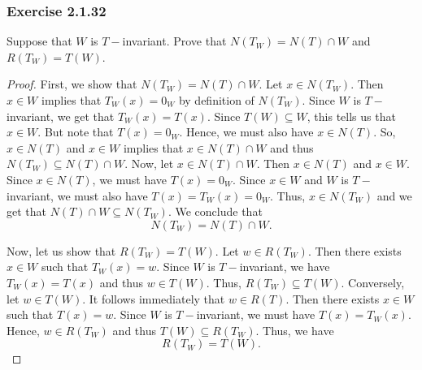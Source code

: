\subsubsection{Exercise 2.1.32} Suppose that \( W  \) is \( T- \)invariant. Prove that \( N(T_{W}) = N(T) \cap W  \) and \( R(T_{W}) = T(W) \).
\begin{proof}
    First, we show that \( N(T_{W}) = N(T) \cap W  \). Let \( x \in N(T_{W}) \). Then \( x \in W  \) implies that \( T_{W}(x) = 0_{W}  \) by definition of \( N(T_{W}) \). Since \( W  \) is \( T- \)invariant, we get that \( T_{W}(x) = T(x)  \). Since \( T(W) \subseteq W  \), this tells us that \( x \in W  \). But note that \( T(x) = 0_{W}   \). Hence, we must also have \( x \in N(T)  \). So, \( x \in N(T) \) and \( x \in W  \) implies that \( x \in N(T) \cap W   \) and thus \( N(T_{W}) \subseteq N(T) \cap W  \). Now, let \( x \in N(T) \cap W  \). Then \( x \in N(T)  \) and \( x \in W  \). Since \( x \in N(T)  \),  we must have \( T(x) = 0_{W} \). Since \( x \in W  \) and \( W  \) is \( T- \)invariant, we must also have \( T(x) = T_{W}(x) = 0_{W} \). Thus, \( x \in N(T_{W}) \) and we get that \( N(T) \cap W \subseteq N(T_{W}) \). We conclude that
    \[ N(T_{W}) = N(T) \cap W.  \]


    Now, let us show that \( R(T_{W}) = T(W) \). Let \( w \in R(T_{W}) \). Then there exists \( x \in W  \) such that \( T_{W}(x) = w  \). Since \( W  \) is \( T- \)invariant, we have \( T_{W}(x) = T(x)  \) and thus \( w \in T(W) \). Thus, \( R(T_{W}) \subseteq T(W)  \). Conversely, let \( w \in T(W) \). It follows immediately that \( w \in R(T) \). Then there exists \( x \in W  \) such that \( T(x) = w  \). Since \( W  \) is \( T- \)invariant, we must have \( T(x) = T_{W}(x) \). Hence, \( w \in R(T_{W}) \) and thus \( T(W) \subseteq R(T_{W})  \). Thus, we have
    \[  R(T_{W}) = T(W). \]
\end{proof}

